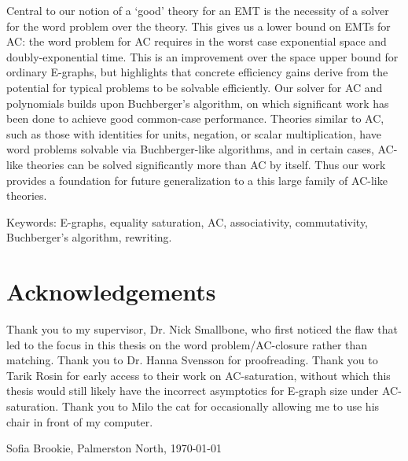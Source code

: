 \documentclass[12pt,a4paper,twoside,openright]{report}
\numberwithin{equation}{chapter}		%
\numberwithin{figure}{chapter}			%
\numberwithin{table}{chapter}			%
\theoremstyle{definition}
\theoremstyle{plain}
\begin{document}
Central to our notion of a `good' theory for an EMT is the necessity of a solver for the word problem over the theory. This gives us a lower bound on EMTs for AC: the word problem for AC requires in the worst case exponential space and doubly-exponential time. This is an improvement over the space upper bound for ordinary E-graphs, but highlights that concrete efficiency gains derive from the potential for typical problems to be solvable efficiently. Our solver for AC and polynomials builds upon Buchberger's algorithm, on which significant work has been done to achieve good common-case performance. Theories similar to AC, such as those with identities for units, negation, or scalar multiplication, have word problems solvable via Buchberger-like algorithms, and in certain cases, AC-like theories can be solved significantly more than AC by itself. Thus our work provides a foundation for future generalization to a this large family of AC-like theories.

\vfill
Keywords: E-graphs, equality saturation, AC, associativity, commutativity, Buchberger's algorithm, rewriting.

\newpage				%
\thispagestyle{empty}
\mbox{}

\newpage
\thispagestyle{plain}			%
\section*{Acknowledgements}
Thank you to my supervisor, Dr. Nick Smallbone, who first noticed the flaw that led to the focus in this thesis on the word problem/AC-closure rather than matching. Thank you to Dr. Hanna Svensson for proofreading. Thank you to Tarik Rosin for early access to their work on AC-saturation, without which this thesis would still likely have the incorrect asymptotics for E-graph size under AC-saturation. Thank you to Milo the cat for occasionally allowing me to use his chair in front of my computer.

\vspace{1.5cm}
\hfill
Sofia Brookie, Palmerston North, \today

\newpage				%
\thispagestyle{empty}
\mbox{}

\newpage
\tableofcontents

\cleardoublepage
{}
{} 
\listoffigures
\cleardoublepage
{}
{}  
\listoftables
\end{document}
